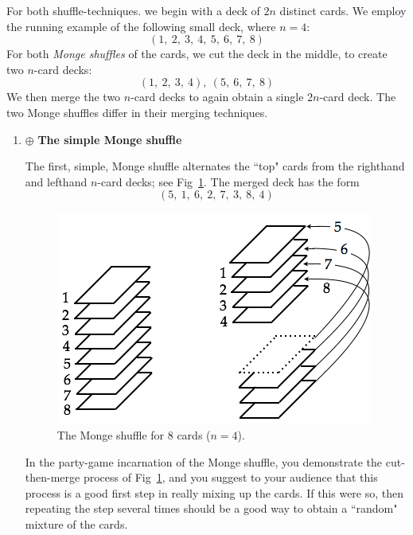 \begin{itemize}
\smallskip

For both shuffle-techniques. we begin with a deck of $2n$ distinct cards.  We employ the running example of the following small deck, where $n=4$:
\[ (1, \ 2, \ 3, \ 4, \ 5, \ 6, \ 7, \ 8) \]
For both {\it Monge shuffles} of the cards, we cut the deck in the middle, to create two $n$-card decks:
\[ (1, \ 2, \ 3, \ 4), \ (5, \ 6, \ 7, \ 8) \]
We then merge the two $n$-card decks to again obtain a single $2n$-card deck.  The two Monge shuffles differ in their merging techniques.

  \begin{enumerate}
  \item $\oplus$ {\bf The simple Monge shuffle}

\smallskip

The first, simple, Monge shuffle alternates the ``top" cards from the righthand and lefthand $n$-card decks; see Fig~\ref{fig:suffleMonge}.  The merged deck has the form
\[ (5, \ 1, \ 6, \ 2, \ 7, \ 3, \ 8, \ 4) \]
\begin{figure}[h]
\begin{center}
        \includegraphics[scale=0.4]{FiguresArithmetic/suffleMongeBasic}
        \caption{The Monge shuffle for $8$ cards ($n=4$).}
        \label{fig:suffleMonge}
\end{center}
\end{figure}

In the party-game incarnation of the Monge shuffle, you demonstrate the cut-then-merge process of Fig~\ref{fig:suffleMonge}, and you suggest to your audience that this process is a good first step in really mixing up the cards.  If this were so, then repeating the step several times should be a good way to obtain a ``random" mixture of the cards.

\smallskip


\end{enumerate}
\end{itemize}
